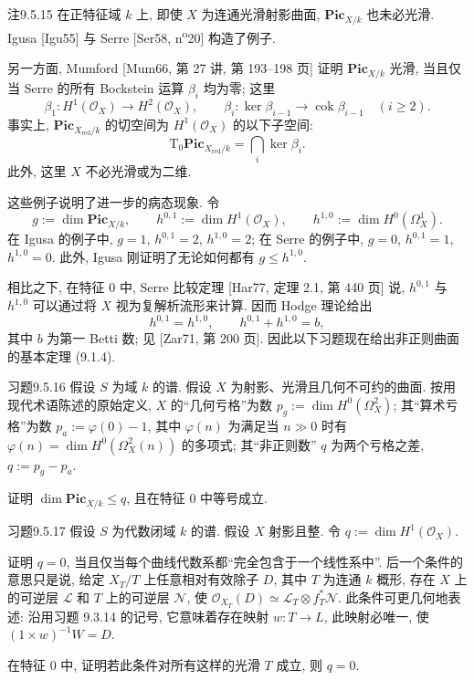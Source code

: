 \begin{origstatement}{注}{9.5.15}\label{ch09s05:rem9.5.15}
在正特征域 $k$ 上, 即使 $X$ 为连通光滑射影曲面, $\mathbf{Pic}_{X/k}$ 也未必光滑. Igusa [Igu55] 与 Serre [Ser58, n\textsuperscript{o}20] 构造了例子.

另一方面, Mumford [Mum66, 第 27 讲, 第 193--198 页] 证明 $\mathbf{Pic}_{X/k}$ 光滑, 当且仅当 Serre 的所有 Bockstein 运算 $\beta_i$ 均为零; 这里
\[
 \beta_1:H^1(\mathcal O_X)\longrightarrow H^2(\mathcal O_X),\qquad
 \beta_i:\ker\beta_{i-1}\longrightarrow\operatorname{cok}\beta_{i-1}\quad(i\geq2).
\]
事实上, $\mathbf{Pic}_{X_{\mathrm{red}}/k}$ 的切空间为 $H^1(\mathcal O_X)$ 的以下子空间:
\[
 \mathrm T_0\mathbf{Pic}_{X_{\mathrm{red}}/k}=\bigcap_i\ker\beta_i.
\]
此外, 这里 $X$ 不必光滑或为二维.

这些例子说明了进一步的病态现象. 令
\[
 g:=\dim\mathbf{Pic}_{X/k},\qquad
 h^{0,1}:=\dim H^1(\mathcal O_X),\qquad
 h^{1,0}:=\dim H^0(\Omega_X^1).
\]
在 Igusa 的例子中, $g=1$, $h^{0,1}=2$, $h^{1,0}=2$; 在 Serre 的例子中, $g=0$, $h^{0,1}=1$, $h^{1,0}=0$. 此外, Igusa 刚证明了无论如何都有 $g\leq h^{1,0}$.

相比之下, 在特征 $0$ 中, Serre 比较定理 [Har77, 定理 2.1, 第 440 页] 说, $h^{0,1}$ 与 $h^{1,0}$ 可以通过将 $X$ 视为复解析流形来计算. 因而 Hodge 理论给出
\[
 h^{0,1}=h^{1,0},\qquad h^{0,1}+h^{1,0}=b,
\]
其中 $b$ 为第一 Betti 数; 见 [Zar71, 第 200 页]. 因此以下习题现在给出非正则曲面的基本定理 (9.1.4).
\end{origstatement}


\begin{origstatement}{习题}{9.5.16}\label{ch09s05:ex9.5.16}
假设 $S$ 为域 $k$ 的谱. 假设 $X$ 为射影、光滑且几何不可约的曲面. 按用现代术语陈述的原始定义, $X$ 的“几何亏格”为数 $p_g:=\dim H^0(\Omega_X^2)$; 其“算术亏格”为数 $p_a:=\varphi(0)-1$, 其中 $\varphi(n)$ 为满足当 $n\gg0$ 时有 $\varphi(n)=\dim H^0(\Omega_X^2(n))$ 的多项式; 其“非正则数” $q$ 为两个亏格之差, $q:=p_g-p_a$.

证明 $\dim\mathbf{Pic}_{X/k}\leq q$, 且在特征 $0$ 中等号成立.
\end{origstatement}

\begin{origstatement}{习题}{9.5.17}\label{ch09s05:ex9.5.17}
假设 $S$ 为代数闭域 $k$ 的谱. 假设 $X$ 射影且整. 令 $q:=\dim H^1(\mathcal O_X)$.

证明 $q=0$, 当且仅当每个曲线代数系都“完全包含于一个线性系中”. 后一个条件的意思只是说, 给定 $X_T/T$ 上任意相对有效除子 $D$, 其中 $T$ 为连通 $k$ 概形, 存在 $X$ 上的可逆层 $\mathcal L$ 和 $T$ 上的可逆层 $\mathcal N$, 使 $\mathcal O_{X_T}(D)\simeq\mathcal L_T\otimes f_T^*\mathcal N$. 此条件可更几何地表述: 沿用习题 9.3.14 的记号, 它意味着存在映射 $w:T\to L$, 此映射必唯一, 使 $(1\times w)^{-1}W=D$.

在特征 $0$ 中, 证明若此条件对所有这样的光滑 $T$ 成立, 则 $q=0$.
\end{origstatement}

